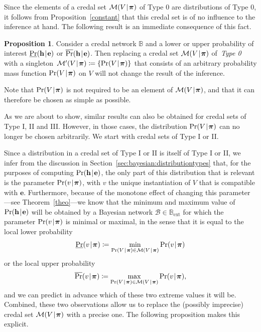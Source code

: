 \documentclass[10pt,a4paper]{paper}
\theoremstyle{definition}
\newtheorem{prop}[theorem]{Proposition}
\newcommand{\vbpi}{\boldsymbol\pi}
\newcommand{\hyp}{\mathbf{h}}
\newcommand{\ev}{\mathbf{e}}
\newcommand{\credal}{\mathcal{M}}
\newcommand{\newmid}{\hspace{0.9pt}\vert\hspace{0.9pt}}
\begin{document}
Since the elements of a credal set $\credal(V\newmid \vbpi)$ of Type 0 are distributions of Type 0, it follows from Proposition~\ref{constant} that this credal set is of no influence to the inference at hand. The following result is an immediate consequence of this fact.

\begin{prop}\label{credalType0}
Consider a credal network ${\mathbb B}$ and a lower or upper probability of interest $\underline{\Pr}(\hyp\newmid\ev)$ or $\overline{\Pr}(\hyp\newmid\ev)$. Then replacing a credal set $\credal(V\newmid \vbpi)$ of\, \emph{Type 0} with a singleton~$\credal'(V\newmid \vbpi)\coloneqq\{\Pr(V\newmid\vbpi)\}$ that consists of an arbitrary probability mass function $\Pr(V\newmid\vbpi)$ on $V$ will not change the result of the inference.
\end{prop}
\noindent
Note that $\Pr(V\newmid\vbpi)$ is not required to be an element of $\credal(V\newmid \vbpi)$, and that it can therefore be chosen as simple as possible.

As we are about to show, similar results can also be obtained for credal sets of Type I, II and III. However, in those cases, the distribution $\Pr(V\newmid\vbpi)$ can no longer be chosen arbitrarily. We start with credal sets of Type I or II.

Since a distribution in a credal set of Type I or II is itself of Type I or II,  we infer from the discussion in Section~\ref{sec:bayesian:distributiontypes} that, for the purposes of computing $\Pr(\hyp\newmid\ev)$, the only part of this distribution that is relevant is the parameter $\Pr(v\newmid \vbpi)$, with $v$ the unique instantiation of $V$ that is compatible with $\ev$. Furthermore, because of the monotone effect of changing this parameter---see Theorem~\ref{theo}---we know that the minimum and maximum value of $\Pr(\hyp\newmid\ev)$ will be obtained by a Bayesian network $\mathcal{B}\in\mathbb{B}_{\mathrm{ext}}$ for which the parameter $\Pr(v\newmid\vbpi)$ is minimal or maximal, in the sense that it is equal to the local lower probability
\begin{equation*}
\underline{\Pr}(v\newmid\vbpi)\coloneqq\min_{\Pr(V\newmid\vbpi)\in\credal(V\newmid\vbpi)}\Pr(v\newmid\vbpi)
\end{equation*}
or the local upper probability
\begin{equation*}
\overline{\Pr}(v\newmid\vbpi)\coloneqq\max_{\Pr(V\newmid\vbpi)\in\credal(V\newmid\vbpi)}\Pr(v\newmid\vbpi),
\end{equation*}
and we can predict in advance which of these two extreme values it will be. Combined, these two observations allow us to replace the (possibly imprecise) credal set $\credal(V\newmid \vbpi)$ with a precise one. The following proposition makes this explicit.
\end{document}
